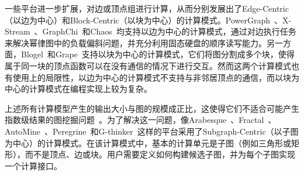一些平台进一步扩展，对边或顶点组进行计算，从而分别发展出了Edge-Centric（以边为中心）和Block-Centric（以块为中心）的计算模式。PowerGraph~\cite{gonzalez2012powergraph}、X-Stream~\cite{roy2013x}、GraphChi~\cite{kyrola2012graphchi}和Chaos~\cite{roy2015chaos}均支持以边为中心的计算模式，通过对边执行任务来解决幂律图中的负载偏斜问题，并充分利用固态硬盘的顺序读写能力。另一方面，Blogel~\cite{yan2014blogel}和Grape~\cite{fan2017grape}支持以块为中心的计算模式，它们将图分割成多个块，使得属于同一块的顶点函数可以在没有通信的情况下进行交互。然而这两个计算模式也有使用上的局限性，以边为中心的计算模式不支持与非邻居顶点的通信，而以块为中心的计算模式在编程实现上较为复杂。

上述所有计算模型产生的输出大小与图的规模成正比，这使得它们不适合可能产生指数级结果的图挖掘问题~\cite{yan2017big, yan2024systems}。为了解决这一问题，像Arabesque~\cite{teixeira2015arabesque}、Fractal~\cite{dias2019fractal}、AutoMine~\cite{mawhirter2019automine}、Peregrine~\cite{jamshidi2020peregrine}和G-thinker~\cite{yan2020g}这样的平台采用了Subgraph-Centric（以子图为中心）的计算模式。在该计算模式中，基本的计算单元是子图（例如三角形或矩形），而不是顶点、边或块。用户需要定义如何构建候选子图，并为每个子图实现一个计算接口。



